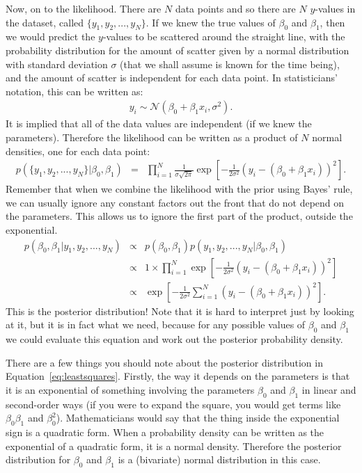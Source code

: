 Now, on to the likelihood. There are $N$ data points and so there are $N$
$y$-values in the dataset, called $\{y_1, y_2, ..., y_N\}$. If we
knew the true values of $\beta_0$ and $\beta_1$, then we would predict the
$y$-values to be scattered around the straight line, with the probability
distribution for the amount of scatter given by a normal distribution with
standard deviation $\sigma$ (that we shall assume is known for the time being),
and the amount of scatter is independent for
each data point. In statisticians' notation, this can be written as:
\begin{eqnarray}
y_i \sim \mathcal{N}(\beta_0 + \beta_1 x_i, \sigma^2).
\end{eqnarray}
It is implied that all of the data values are independent (if we knew the
parameters). Therefore the likelihood can be written as a product of $N$
normal densities, one for each data point:
\begin{eqnarray}
p(\{y_1, y_2, ..., y_N\}|\beta_0, \beta_1) &=& \prod_{i=1}^N \frac{1}{\sigma\sqrt{2\pi}}
\exp\left[-\frac{1}{2\sigma^2}\left(y_i - (\beta_0 + \beta_1 x_i)\right)^2\right].
\end{eqnarray}
Remember that when we combine the likelihood with the prior using Bayes' rule,
we can usually ignore any constant factors out the front that do not depend on
the parameters. This allows us to ignore the first part of the product, outside
the exponential.
\begin{eqnarray}
p(\beta_0, \beta_1 | y_1, y_2, ..., y_N) &\propto& p(\beta_0, \beta_1)
p(y_1, y_2, ..., y_N|\beta_0, \beta_1)\\
&\propto& 1 \times \prod_{i=1}^N \exp\left[-\frac{1}{2\sigma^2}\left(y_i - (\beta_0 + \beta_1 x_i)\right)^2\right]\\
&\propto& \exp\left[-\frac{1}{2\sigma^2}\sum_{i=1}^N\left(y_i - (\beta_0 + \beta_1 x_i)\right)^2\right].
\label{eq:leastsquares}
\end{eqnarray}
This is the posterior distribution! Note that it is hard to interpret just by
looking at it, but it
is in fact what we need, because for any possible values of $\beta_0$ and $\beta_1$
we could evaluate this equation and work out the posterior probability density.

There are a few things you should note about the posterior distribution in
Equation~\ref{eq:leastsquares}. Firstly, the way it depends on the parameters
is that it is an exponential of something involving the parameters $\beta_0$
and $\beta_1$ in linear and second-order ways (if you were to expand the square,
you would get terms like $\beta_0\beta_1$ and $\beta_0^2$). Mathematicians would
say that the thing inside the exponential sign is a quadratic form. When a
probability density can be written as the exponential of a quadratic form, it
is a normal density. Therefore the posterior distribution for $\beta_0$ and
$\beta_1$ is a (bivariate) normal distribution in this case.


